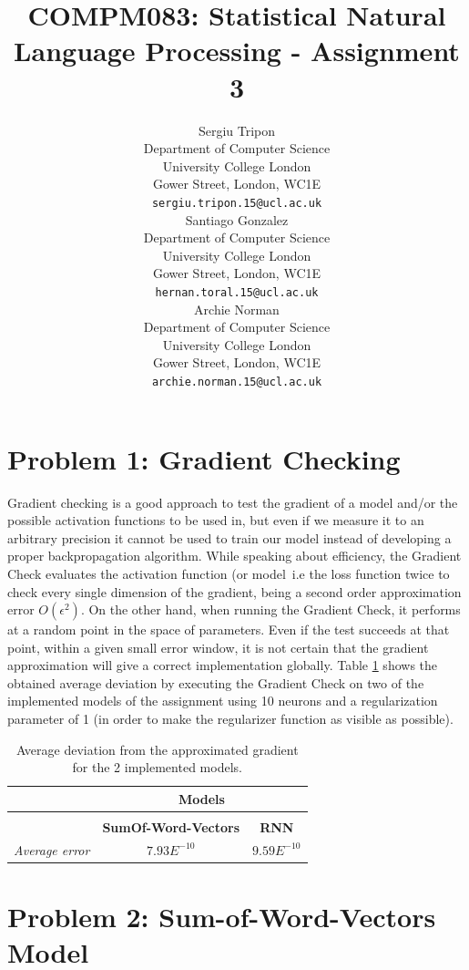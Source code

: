 \documentclass{article} %
\title{COMPM083: Statistical Natural Language Processing - Assignment 3}
\author{
Sergiu Tripon\\
Department of Computer Science\\
University College London\\
Gower Street, London, WC1E\\
\texttt{sergiu.tripon.15@ucl.ac.uk}\\
\And
Santiago Gonzalez\\
Department of Computer Science\\
University College London\\
Gower Street, London, WC1E\\
\texttt{hernan.toral.15@ucl.ac.uk} \\
\And
Archie Norman \\
Department of Computer Science\\
University College London\\
Gower Street, London, WC1E\\
\texttt{archie.norman.15@ucl.ac.uk} \\
}
\begin{document}
\maketitle

\section{Problem 1: Gradient Checking}

Gradient checking is a good approach to test the gradient of a model and/or the possible activation functions to be used in, but even if we measure it to an arbitrary precision it cannot be used to train our model instead of developing a proper backpropagation algorithm. While speaking about efficiency, the Gradient Check evaluates the activation function (or model\ i.e the loss function twice to check every single dimension of the gradient, being a second order approximation error $O(\epsilon^2)$. On the other hand, when running the Gradient Check, it performs at a random point in the space of parameters. Even if the test succeeds at that point, within a given small error window, it is not certain that the gradient approximation will give a correct implementation globally.\cite{StandfordUniversity} Table \ref{table:averageError} shows the obtained average deviation by executing the Gradient Check on two of the implemented models of the assignment using 10 neurons and a regularization parameter of 1 (in order to make the regularizer function as visible as possible).

\begin{table}[!htp]
\caption{Average deviation from the approximated gradient for the 2 implemented models.}
\label{table:averageError}
\begin{center}
\begin{tabular}{c c c}
\multicolumn{1}{c}{} & \multicolumn{2}{c}{\bf Models}
\\ \hline \\
{} & \textbf{SumOf-Word-Vectors} & \textbf{RNN}\\
\textit{Average error} & $7.93E^{-10}$ & $9.59E^{-10}$ \\
\end{tabular}
\end{center}
\end{table}

\section{Problem 2: Sum-of-Word-Vectors Model}
\end{document}
